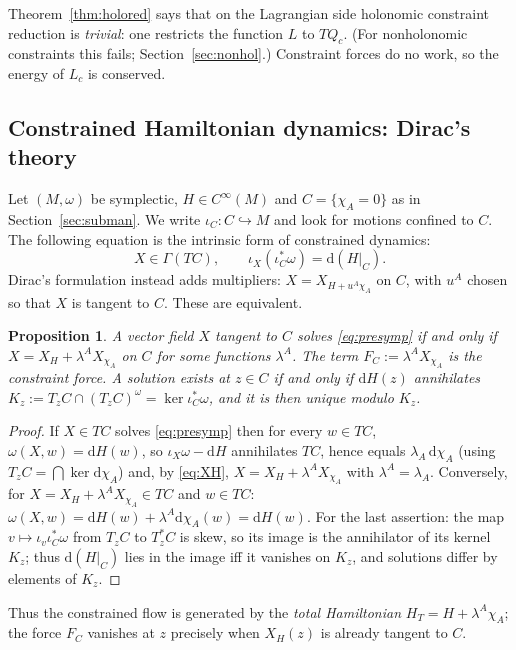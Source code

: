 \documentclass[11pt,a4paper]{article}
\numberwithin{equation}{section}
\theoremstyle{plain}
\newtheorem{proposition}[theorem]{Proposition}
\theoremstyle{definition}
\theoremstyle{remark}
\newcommand{\dd}{\mathrm{d}}
\begin{document}
Theorem~\ref{thm:holored} says that on the Lagrangian side holonomic constraint reduction is \emph{trivial}: one restricts the function $L$ to $TQ_c$. (For nonholonomic constraints this fails; Section~\ref{sec:nonhol}.) Constraint forces do no work, so the energy of $L_c$ is conserved.

\subsection{Constrained Hamiltonian dynamics: Dirac's theory}\label{sec:dirac}

Let $(M,\omega)$ be symplectic, $H\in C^\infty(M)$ and $C=\{\chi_A=0\}$ as in Section~\ref{sec:subman}. We write $\iota_C:C\hookrightarrow M$ and look for motions confined to $C$. The following equation is the intrinsic form of constrained dynamics:
\begin{equation}\label{eq:presymp}
X\in\Gamma(TC),\qquad \iota_X(\iota_C^*\omega)=\dd(H|_C).
\end{equation}
Dirac's formulation instead adds multipliers: $X=X_{H+u^A\chi_A}$ on $C$, with $u^A$ chosen so that $X$ is tangent to $C$. These are equivalent.

\begin{proposition}\label{prop:equiv}
A vector field $X$ tangent to $C$ solves \eqref{eq:presymp} if and only if $X=X_H+\lambda^AX_{\chi_A}$ on $C$ for some functions $\lambda^A$. The term $F_C:=\lambda^AX_{\chi_A}$ is the \emph{constraint force}. A solution exists at $z\in C$ if and only if $\dd H(z)$ annihilates $K_z:=T_zC\cap(T_zC)^\omega=\ker\iota_C^*\omega$, and it is then unique modulo $K_z$.
\end{proposition}
\begin{proof}
If $X\in TC$ solves \eqref{eq:presymp} then for every $w\in TC$, $\omega(X,w)=\dd H(w)$, so $\iota_X\omega-\dd H$ annihilates $TC$, hence equals $\lambda_A\,\dd\chi_A$ (using $T_zC=\bigcap\ker\dd\chi_A$) and, by \eqref{eq:XH}, $X=X_H+\lambda^AX_{\chi_A}$ with $\lambda^A=\lambda_A$. Conversely, for $X=X_H+\lambda^AX_{\chi_A}\in TC$ and $w\in TC$: $\omega(X,w)=\dd H(w)+\lambda^A\dd\chi_A(w)=\dd H(w)$. For the last assertion: the map $v\mapsto\iota_v\iota_C^*\omega$ from $T_zC$ to $T_z^*C$ is skew, so its image is the annihilator of its kernel $K_z$; thus $\dd(H|_C)$ lies in the image iff it vanishes on $K_z$, and solutions differ by elements of $K_z$.
\end{proof}

Thus the constrained flow is generated by the \emph{total Hamiltonian} $H_T=H+\lambda^A\chi_A$; the force $F_C$ vanishes at $z$ precisely when $X_H(z)$ is already tangent to $C$.
\end{document}
